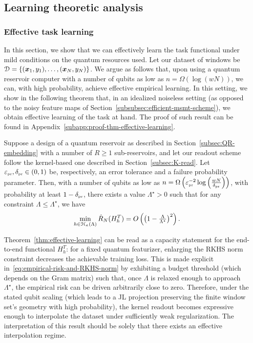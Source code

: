 \subsection{Learning theoretic analysis}\label{subsec:learning-theoretic-analysis}
\subsubsection{Effective task learning}\label{subsec:effective-learning}
In this section, we show that we can effectively learn the task functional under mild conditions on the quantum resources used. Let our dataset of windows be ${\mathcal{D}} = \{({\bm{x}}_1, y_1), \dots, ({\bm{x}}_N, y_N) \}$. We argue as follows that, upon using a quantum reservoir computer with a number of qubits as low as $n = \Omega(\log(w N))$, we can, with high probability, achieve effective empirical learning. In this setting, we show in the following theorem that, in an idealized noiseless setting (as opposed to the noisy feature maps of Section~\ref{subsubsec:efficient-msmt-scheme}), we obtain effective learning of the task at hand. The proof of such result can be found in Appendix~\ref{subapp:proof-thm-effective-learning}.

\begin{theorem}\label{thm:effective-learning}
    Suppose a design of a quantum reservoir as described in Section~\ref{subsec:QR-embedding} with a number of $R \geq 1$ sub-reservoirs, and let our readout scheme follow the kernel-based one described in Section~\ref{subsec:K-read}. Let $\varepsilon_{\scriptscriptstyle \operatorname{pr}}, \delta_{\scriptscriptstyle \operatorname{pr}}  \in (0,1)$ be, respectively, an error tolerance and a failure probability parameter. Then, with a number of qubits as low as $n = \Omega\left(\varepsilon_{\scriptscriptstyle \operatorname{pr}}^{-2} \log\left(\tfrac{w N}{\delta_{\scriptscriptstyle \operatorname{pr}}}\right)\right)$, with probability at least $1-\delta_{\scriptscriptstyle \operatorname{pr}}$, there exists a value $\Lambda^\star > 0$ such that for any constraint $\Lambda \leq \Lambda^\star$, we have
    \begin{equation}\label{eq:empirical-risk-and-RKHS-norm}
        \min_{h\in {\mathcal{H}}_{\kappa}(\Lambda)} \hat{R}_N(H^T_h) = O\left(\big(1 - \tfrac{\Lambda}{\Lambda^\star}\big)^2\right).
    \end{equation}
\end{theorem}

Theorem~\ref{thm:effective-learning} can be read as a capacity statement for the end-to-end functional $H^T_h$: for a fixed quantum featurizer, enlarging the RKHS norm constraint decreases the achievable training loss. This is made explicit in~\cref{eq:empirical-risk-and-RKHS-norm} by exhibiting a budget threshold (which depends on the Gram matrix) such that, once $\Lambda$ is relaxed enough to approach $\Lambda^\star$, the empirical risk can be driven arbitrarily close to zero. Therefore, under the stated qubit scaling (which leads to a JL projection preserving the finite window set's geometry with high probability), the kernel readout becomes expressive enough to interpolate the dataset under sufficiently weak regularization. The interpretation of this result should be solely that there exists an effective interpolation regime.


